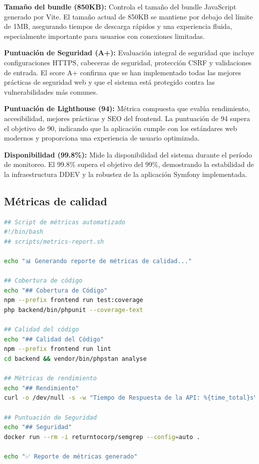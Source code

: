 \documentclass[12pt,a4paper,oneside]{report}
\begin{document}
\textbf{Tamaño del bundle (850KB):} Controla el tamaño del bundle JavaScript generado por Vite. El tamaño actual de 850KB se mantiene por debajo del límite de 1MB, asegurando tiempos de descarga rápidos y una experiencia fluida, especialmente importante para usuarios con conexiones limitadas.

\textbf{Puntuación de Seguridad (A+):} Evaluación integral de seguridad que incluye configuraciones HTTPS, cabeceras de seguridad, protección CSRF y validaciones de entrada. El score A+ confirma que se han implementado todas las mejores prácticas de seguridad web y que el sistema está protegido contra las vulnerabilidades más comunes.

\textbf{Puntuación de Lighthouse (94):} Métrica compuesta que evalúa rendimiento, accesibilidad, mejores prácticas y SEO del frontend. La puntuación de 94 supera el objetivo de 90, indicando que la aplicación cumple con los estándares web modernos y proporciona una experiencia de usuario optimizada.

\textbf{Disponibilidad (99.8\%):} Mide la disponibilidad del sistema durante el período de monitoreo. El 99.8\% supera el objetivo del 99\%, demostrando la estabilidad de la infraestructura DDEV y la robustez de la aplicación Symfony implementada.

\subsection{Métricas de calidad}\label{muxe9tricas-de-calidad}

\begin{lstlisting}[language=bash]
## Script de métricas automatizado
#!/bin/bash
## scripts/metrics-report.sh

echo "📊 Generando reporte de métricas de calidad..."

## Cobertura de código
echo "## Cobertura de Código"
npm --prefix frontend run test:coverage
php backend/bin/phpunit --coverage-text

## Calidad del código
echo "## Calidad del Código"
npm --prefix frontend run lint
cd backend && vendor/bin/phpstan analyse

## Métricas de rendimiento
echo "## Rendimiento"
curl -o /dev/null -s -w "Tiempo de Respuesta de la API: %{time_total}s\n" https://api.tfg-platform.com/health

## Puntuación de Seguridad
echo "## Seguridad"
docker run --rm -i returntocorp/semgrep --config=auto .

echo "✅ Reporte de métricas generado"
\end{lstlisting}
\end{document}
